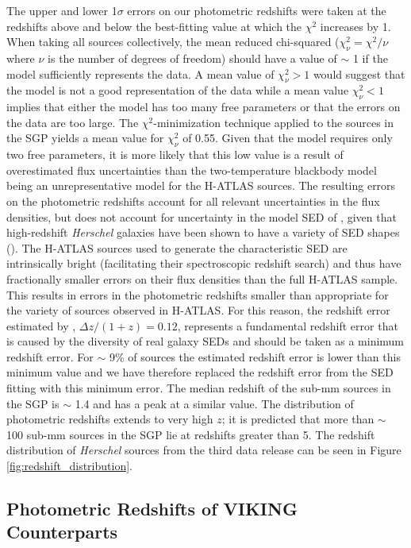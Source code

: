 The upper and lower 1$\sigma$ errors on our photometric redshifts were taken at the redshifts above and below the best-fitting value at which the $\chi^2$ increases by 1. When taking all sources collectively, the mean reduced chi-squared ($\chi_\nu^2 = \chi^2/\nu$ where $\nu$ is the number of degrees of freedom) should have a value of $\sim$ 1 if the model sufficiently represents the data. A mean value of $\chi_\nu^2 > 1$ would suggest that the model is not a good representation of the data while a mean value $\chi_\nu^2 < 1$ implies that either the model has too many free parameters or that the errors on the data are too large. The $\chi^2$-minimization technique applied to the sources in the SGP yields a mean value for $\chi_\nu^2$ of 0.55. Given that the model requires only two free parameters, it is more likely that this low value is a result of overestimated flux uncertainties than the two-temperature blackbody model being an unrepresentative model for the H-ATLAS sources. The resulting errors on the photometric redshifts account for all relevant uncertainties in the flux densities, but does not account for uncertainty in the model SED of \citealt{Pearson_2013}, given that high-redshift \textit{Herschel} galaxies have been shown to have a variety of SED shapes (\citealt{Bakx_2018}). The H-ATLAS sources used to generate the characteristic SED are intrinsically bright (facilitating their spectroscopic redshift search) and thus have fractionally smaller errors on their flux densities than the full H-ATLAS sample. This results in errors in the photometric redshifts smaller than appropriate for the variety of sources observed in H-ATLAS. For this reason, the redshift error estimated by \citealt{Pearson_2013}, $\Delta z/(1+z) = 0.12$, represents a fundamental redshift error that is caused by the diversity of real galaxy SEDs and should be taken as a minimum redshift error. For $\sim$ 9\% of sources the estimated redshift error is lower than this minimum value and we have therefore replaced the redshift error from the SED fitting with this minimum error. The median redshift of the sub-mm sources in the SGP is $\sim$ 1.4 and has a peak at a similar value. The distribution of photometric redshifts extends to very high $z$; it is predicted that more than $\sim$ 100 sub-mm sources in the SGP lie at redshifts greater than 5. The redshift distribution of \textit{Herschel} sources from the third data release can be seen in Figure \ref{fig:redshift_distribution}.

\subsection{Photometric Redshifts of VIKING Counterparts}
\label{sec:phot_z_VIKING}

